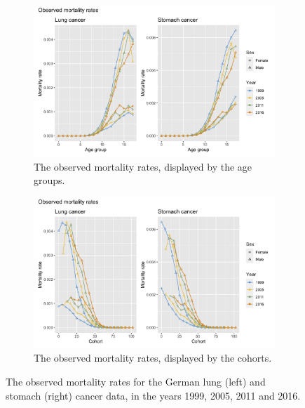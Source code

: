 \begin{figure}
    \centering
    \begin{subfigure}[b]{.6\linewidth}
        \includegraphics[width=\linewidth]{real-data/real-data-univariate/Figures/data-age-rate.png}
        \caption{The observed mortality rates, displayed by the age groups.}
        \label{fig:data-rate-top}
    \end{subfigure}
    
    \begin{subfigure}[b]{.6\linewidth}
        \includegraphics[width=\linewidth]{real-data/real-data-univariate/Figures/data-cohort-rate.png}
        \caption{The observed mortality rates, displayed by the cohorts.}
        \label{fig:data-rate-bottom}
    \end{subfigure}
    \caption{The observed mortality rates for the German lung (left) and stomach (right) cancer data, in the years 1999, 2005, 2011 and 2016.}
    \label{fig:data-rate}
\end{figure}

